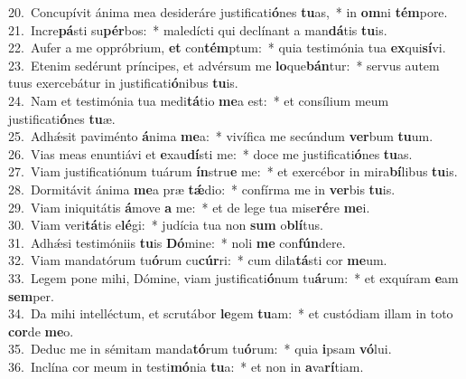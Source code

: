 {20.~}Concupívit ánima mea desideráre justificati\textbf{ó}nes \textbf{tu}as,~* in \textbf{om}ni \textbf{tém}pore.\\
{21.~}Incre\textbf{pá}sti su\textbf{pér}bos:~* maledícti qui declínant a man\textbf{dá}tis \textbf{tu}is.\\
{22.~}Aufer a me oppróbrium, \textbf{et} con\textbf{tém}ptum:~* quia testimónia tua \textbf{ex}qui\textbf{sí}vi.\\
{23.~}Etenim sedérunt príncipes, et advérsum me \textbf{lo}que\textbf{bán}tur:~* servus autem tuus exercebátur in justificati\textbf{ó}nibus \textbf{tu}is.\\
{24.~}Nam et testimónia tua medi\textbf{tá}tio \textbf{me}a est:~* et consílium meum justificati\textbf{ó}nes \textbf{tu}æ.\\
{25.~}Adhǽsit paviménto \textbf{á}nima \textbf{me}a:~* vivífica me secúndum \textbf{ver}bum \textbf{tu}um.\\
{26.~}Vias meas enuntiávi et \textbf{e}xau\textbf{dí}sti me:~* doce me justificati\textbf{ó}nes \textbf{tu}as.\\
{27.~}Viam justificatiónum tuárum \textbf{ín}stru\textbf{e} me:~* et exercébor in mira\textbf{bí}libus \textbf{tu}is.\\
{28.~}Dormitávit ánima \textbf{me}a præ \textbf{tǽ}dio:~* confírma me in \textbf{ver}bis \textbf{tu}is.\\
{29.~}Viam iniquitátis \textbf{á}move \textbf{a} me:~* et de lege tua mise\textbf{ré}re \textbf{me}i.\\
{30.~}Viam veri\textbf{tá}tis e\textbf{lé}gi:~* judícia tua non \textbf{sum} o\textbf{blí}tus.\\
{31.~}Adhǽsi testimóniis \textbf{tu}is \textbf{Dó}mine:~* noli \textbf{me} con\textbf{fún}dere.\\
{32.~}Viam mandatórum tu\textbf{ó}rum cu\textbf{cúr}ri:~* cum dila\textbf{tá}sti cor \textbf{me}um.\\
{33.~}Legem pone mihi, Dómine, viam justificati\textbf{ó}num tu\textbf{á}rum:~* et exquíram \textbf{e}am \textbf{sem}per.\\
{34.~}Da mihi intelléctum, et scrutábor \textbf{le}gem \textbf{tu}am:~* et custódiam illam in toto \textbf{cor}de \textbf{me}o.\\
{35.~}Deduc me in sémitam manda\textbf{tó}rum tu\textbf{ó}rum:~* quia \textbf{i}psam \textbf{vó}lui.\\
{36.~}Inclína cor meum in testi\textbf{mó}nia \textbf{tu}a:~* et non in \textbf{a}va\textbf{rí}tiam.\\
